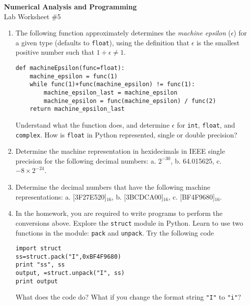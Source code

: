 \documentclass[12pt]{article}
\begin{document}
\begin{center}
\Large
\textbf{Numerical Analysis and Programming}\\
\large
Lab Worksheet \#5
\end{center}
\begin{enumerate}
\item The following function approximately determines the \textit{machine epsilon} ($\epsilon$) for a given type (defaults to \verb!float!), using the definition that $\epsilon$ is the smallest positive number such that $1+\epsilon\ne 1$. 
\small
\begin{verbatim}
def machineEpsilon(func=float):
    machine_epsilon = func(1)
    while func(1)+func(machine_epsilon) != func(1):
        machine_epsilon_last = machine_epsilon
        machine_epsilon = func(machine_epsilon) / func(2)
    return machine_epsilon_last
\end{verbatim}
\normalsize
Understand what the function does,  and determine $\epsilon$ for \verb!int!,  \verb!float!, and \verb!complex!. How is \verb!float! in Python represented, single or double precision? 


\item Determine the machine representation in hexidecimals in IEEE single precision for the following decimal numbers:
a. $2^{−30}$,\;	b. 64.015625,\;	c. $−8\times 2^{−24}$.

\item Determine the decimal numbers that have the following machine representations: a. [3F27E520]$_{16}$,\;	b. [3BCDCA00]$_{16}$,\;	c. [BF4F9680]$_{16}$.
\item In the homework, you are required to write programs to perform the conversions above. Explore the \verb!struct! module in Python. Learn to use two functions in the module: \verb!pack! and \verb!unpack!. 
Try the following code
\begin{verbatim}
import struct
ss=struct.pack("I",0xBF4F9680)
print "ss", ss
output, =struct.unpack("I", ss)
print output
\end{verbatim}
What does the code do? What if you change the format string \verb!"I"! to \verb!"i"!?
\end{enumerate}
\end{document}

